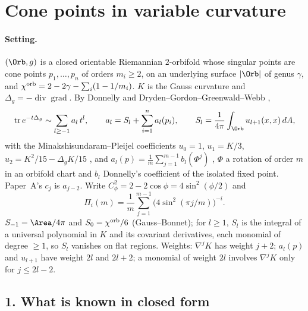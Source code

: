
\section*{Cone points in variable curvature}

\paragraph{Setting.}
$(\Orb,g)$ is a closed orientable Riemannian $2$-orbifold whose singular points are cone points
$p_1,\dots,p_n$ of orders $m_i\ge2$, on an underlying surface $|\Orb|$ of genus $\gamma$, and
$\chi^{\rm orb}=2-2\gamma-\sum_i(1-1/m_i)$. $K$ is the Gauss curvature and $\Delta_g=-\operatorname{div}\operatorname{grad}$.
By Donnelly and Dryden--Gordon--Greenwald--Webb \cite[4.1, Thm~4.8, Prop.~4.11]{dggw2008},
\begin{equation}\label{vc:exp}
\operatorname{tr}e^{-t\Delta_g}\sim\sum_{l\ge-1}a_l\,t^l,\qquad
a_l=S_l+\sum_{i=1}^na_l(p_i),\qquad S_l=\frac1{4\pi}\int_\Orb u_{l+1}(x,x)\,dA,
\end{equation}
with the Minakshisundaram--Pleijel coefficients $u_0=1$, $u_1=K/3$, $u_2=K^2/15-\Delta_gK/15$
\cite[(7)]{schueth2019}, and $a_l(p)=\frac1m\sum_{j=1}^{m-1}b_l(\Phi^j)$ \cite[(17)]{schueth2019},
$\Phi$ a rotation of order $m$ in an orbifold chart and $b_l$ Donnelly's coefficient of the isolated
fixed point. Paper~A's $c_j$ is $a_{j-2}$. Write $C_\phi^2=2-2\cos\phi=4\sin^2(\phi/2)$ and
\[
\Pi_i(m)=\frac1m\sum_{j=1}^{m-1}\bigl(4\sin^2(\pi j/m)\bigr)^{-i}.
\]
$S_{-1}=\Area/4\pi$ and $S_0=\chi^{\rm orb}/6$ (Gauss--Bonnet); for $l\ge1$, $S_l$ is the integral of a
universal polynomial in $K$ and its covariant derivatives, each monomial of degree $\ge1$, so $S_l$
vanishes on flat regions. Weights: $\nabla^jK$ has weight $j+2$; $a_l(p)$ and $u_{l+1}$ have weight $2l$
and $2l+2$; a monomial of weight $2l$ involves $\nabla^jK$ only for $j\le2l-2$.

\subsection*{1. What is known in closed form}

